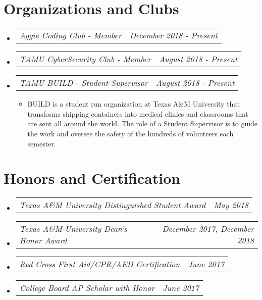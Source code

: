 \documentclass[letterpaper,11pt]{article}
\makeatletter
\newcommand{\resumeAward}[2]{
  \vspace{-1pt}
    \item\begin{tabular*}{0.97\textwidth}{l@{\extracolsep{\fill}}r}
    \textit{\small#1} & \textit{\small #2} \\
    \end{tabular*}\vspace{-20pt}
}
\newcommand{\resumeJobDesc}[1]{
  \item\small{{ #1 \vspace{-2pt}}
  }
}
\newcommand{\resumeSubHeadingListStart}{\begin{itemize}[leftmargin=*]}
\newcommand{\resumeSubHeadingListEnd}{\end{itemize}}
\newcommand{\resumeItemListStart}{\begin{itemize}}
\newcommand{\resumeItemListEnd}{\end{itemize}\vspace{-5pt}}
\makeatother
\begin{document}
\section{Organizations and Clubs}
\resumeSubHeadingListStart
        \resumeAward{Aggie Coding Club - Member}{December 2018 - Present}
        \resumeAward{TAMU CyberSecurity Club - Member}{August 2018 - Present}
        \resumeAward{TAMU BUILD - Student Supervisor}{August 2018 - Present}
        \vspace{3pt}
        \resumeItemListStart
                \resumeJobDesc{BUILD is a student run organization at Texas A\&M University that transforms shipping containers into medical clinics and classrooms that are sent all around the world. The role of a Student Supervisor is to guide the work and oversee the safety of the hundreds of volunteers each semester.}
        \resumeItemListEnd
\resumeSubHeadingListEnd

\section{Honors and Certification}
  \resumeSubHeadingListStart
    \resumeAward{Texas A\&M University Distinguished Student Award}{May 2018}
    \resumeAward{Texas A\&M University Dean's Honor Award}{December 2017, December 2018}
    \resumeAward{Red Cross First Aid/CPR/AED Certification}{June 2017}
    \resumeAward{College Board AP Scholar with Honor}{June 2017}
\resumeSubHeadingListEnd
\vspace{5pt}

\end{document}

